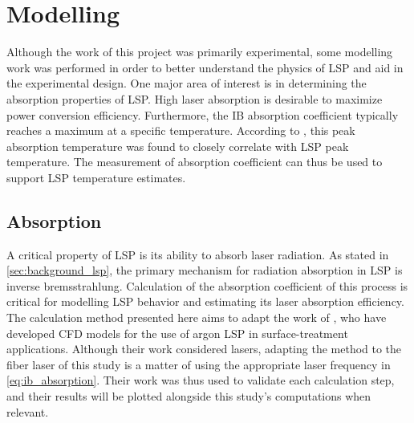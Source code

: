 \chapter{Modelling} \label{chp:models}
    Although the work of this project was primarily experimental, some modelling work was performed in order to better understand the physics of LSP and aid in the experimental design. One major area of interest is in determining the absorption properties of LSP. High laser absorption is desirable to maximize power conversion efficiency. Furthermore, the IB absorption coefficient typically reaches a maximum at a specific temperature. According to \textcite{keeferLaserSustainedPlasmas1989}, this peak absorption temperature was found to closely correlate with LSP peak temperature. The measurement of absorption coefficient can thus be used to support LSP temperature estimates.

    \section{Absorption} \label{sec:models_absorption}
        A critical property of LSP is its ability to absorb laser radiation. As stated in \autoref{sec:background_lsp}, the primary mechanism for radiation absorption in LSP is inverse bremsstrahlung. Calculation of the absorption coefficient of this process is critical for modelling LSP behavior and estimating its laser absorption efficiency. The calculation method presented here aims to adapt the work of \textcite{akarapuNumericalModelLasersustained2009,nassarInvestigationLasersustainedPlasma2012}, who have developed CFD models for the use of argon LSP in surface-treatment applications. Although their work considered  lasers, adapting the method to the fiber laser of this study is a matter of using the appropriate laser frequency in \autoref{eq:ib_absorption}. Their work was thus used to validate each calculation step, and their results will be plotted alongside this study's computations when relevant. 
        
